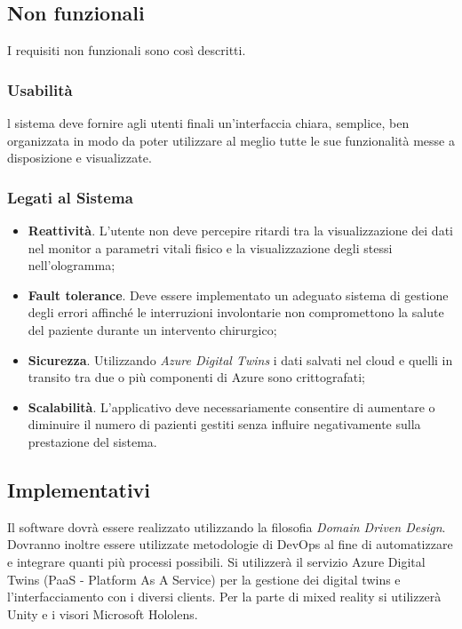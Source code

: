 \subsection{Non funzionali}
I requisiti non funzionali sono così descritti.

\subsubsection{Usabilità}
l sistema deve fornire agli utenti finali un’interfaccia chiara, semplice, ben organizzata in modo da poter utilizzare al meglio tutte le sue funzionalità messe a disposizione e visualizzate.

\subsubsection{Legati al Sistema}
\begin{itemize}
    \item \textbf{Reattività}. L'utente non deve percepire ritardi tra la visualizzazione dei dati nel monitor a parametri vitali fisico e la visualizzazione degli stessi nell'ologramma;
    
    \item \textbf{Fault tolerance}. Deve essere implementato un adeguato sistema di gestione degli errori affinché le interruzioni involontarie non compromettono la salute del paziente durante un intervento chirurgico;
    
    \item \textbf{Sicurezza}. Utilizzando \textit{Azure Digital Twins} i dati salvati nel cloud e quelli in transito tra due o più componenti di Azure sono crittografati;
    
    \item \textbf{Scalabilità}. L’applicativo deve necessariamente consentire di aumentare o diminuire il numero di pazienti gestiti senza influire negativamente sulla prestazione del sistema. 
\end{itemize}

\subsection{Implementativi}
Il software dovrà essere realizzato utilizzando la filosofia \textit{Domain Driven Design}. Dovranno inoltre essere utilizzate metodologie di DevOps al fine di automatizzare e integrare quanti più processi possibili. Si utilizzerà il servizio Azure Digital Twins (PaaS - Platform As A Service) per la gestione dei digital twins e l'interfacciamento con i diversi clients. Per la parte di mixed reality si utilizzerà Unity e i visori Microsoft Hololens.

